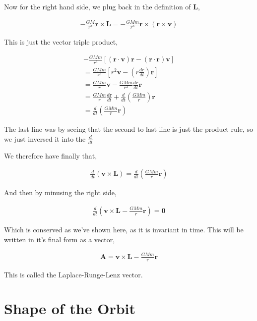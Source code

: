 \documentclass[11pt]{amsart}
\begin{document}
Now for the right hand side, we plug back in the definition of $\mathbf{L}$,

\begin{align*}
  -\frac{GM}{r^3}\mathbf{r}\times\mathbf{L}=-\frac{GMm}{r^3}\mathbf{r}\times\left(\mathbf{r}\times\mathbf{v}\right)
\end{align*}

This is just the vector triple product,

\begin{align*}
  -\frac{GMm}{r^3}\left[\left(\mathbf{r}\cdot\mathbf{v}\right)\mathbf{r}-\left(\mathbf{r}\cdot\mathbf{r}\right)\mathbf{v}\right] \\
  = \frac{GMm}{r^3}\left[r^2 \mathbf{v}-\left(r\frac{dr}{dt}\right)\mathbf{r}\right] \\
  = \frac{GMm}{r}\mathbf{v} - \frac{GMm}{r^2}\frac{dr}{dt}\mathbf{r} \\
  = \frac{GMm}{r}\frac{d\mathbf{r}}{dt} + \frac{d}{dt}\left(\frac{GMm}{r}\right)\mathbf{r} \\
  = \frac{d}{dt}\left(\frac{GMm}{r}\mathbf{r}\right)
\end{align*}

The last line was by seeing that the second to last line is just the product rule, so we just inversed it into the $\frac{d}{dt}$

We therefore have finally that,

\begin{align*}
  \frac{d}{dt}\left(\mathbf{v}\times\mathbf{L}\right) = \frac{d}{dt}\left(\frac{GMm}{r}\mathbf{r}\right)
\end{align*}

And then by minusing the right side,

\begin{align*}
  \frac{d}{dt}\left(\mathbf{v}\times\mathbf{L}-\frac{GMm}{r}\mathbf{r}\right) = \mathbf{0}
\end{align*}

Which is conserved as we've shown here, as it is invariant in time. This will be written in it's final form as a vector,

\begin{align*}
  \mathbf{A} = \mathbf{v}\times\mathbf{L} - \frac{GMm}{r}\mathbf{r}
\end{align*}

This is called the Laplace-Runge-Lenz vector.

\section{Shape of the Orbit}
\end{document}
